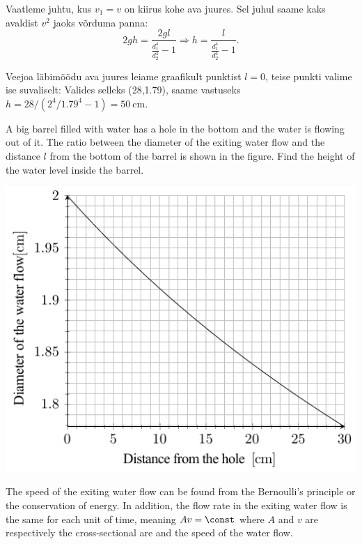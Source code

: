 {Vaatleme juhtu, kus $v_1=v$ on kiirus kohe ava juures. Sel juhul saame kaks avaldist $v^2$ jaoks võrduma panna:
$$2gh=\frac{2gl}{\frac{d_1^4}{d_2^4}-1}\Rightarrow h=\frac{l}{\frac{d_1^4}{d_2^4}-1}.$$

Veejoa läbimõõdu ava juures leiame graafikult punktist $l=0$, teise punkti valime ise suvaliselt: Valides selleks (28,\num{1.79}), saame vastuseks $h=28/(2^4/\num{1.79}^4-1)=\SI{50}{\cm}$.
\fi


\ifEngStatement
A big barrel filled with water has a hole in the bottom and the water is flowing out of it. The ratio between the diameter of the exiting water flow and the distance $l$ from the bottom of the barrel is shown in the figure. Find the height of the water level inside the barrel.
\begin{center}
\includegraphics[width = 0.6\linewidth]{2018-v3g-02-juga_ing}
\end{center}
\fi


\ifEngHint
The speed of the exiting water flow can be found from the Bernoulli’s principle or the conservation of energy. In addition, the flow rate in the exiting water flow is the same for each unit of time, meaning $Av = \const$ where $A$ and $v$ are respectively the cross-sectional are and the speed of the water flow.
\fi


}
